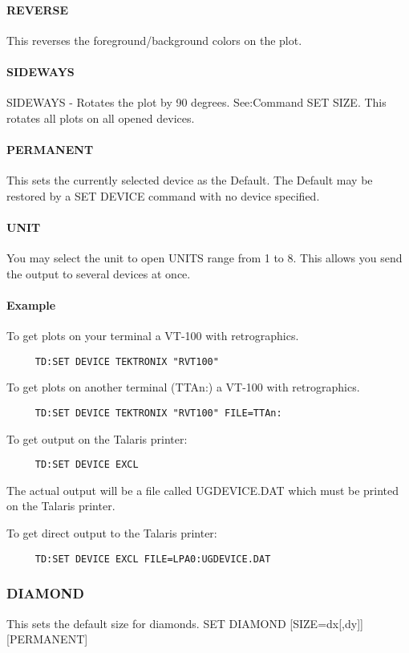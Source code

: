 \paragraph{REVERSE}
This reverses the foreground/background colors on the plot.  
\paragraph{SIDEWAYS}
SIDEWAYS  -  Rotates  the  plot by 90 degrees.  See:Command SET SIZE.
This rotates all plots on all opened devices.  
\paragraph{PERMANENT}
This  sets the currently selected device as the Default.  The Default
may be restored by a SET DEVICE command with no device specified.  
\paragraph{UNIT}
You may select the unit to open UNITS range from 1 to 8.  This allows
you send the output to several devices at once.  
\paragraph{Example}
To get plots on your terminal a VT-100 with retrographics.  
\begin{verbatim}
     TD:SET DEVICE TEKTRONIX "RVT100" 
\end{verbatim}

To get plots on another terminal (TTAn:) a VT-100 with retrographics. 
\begin{verbatim}
     TD:SET DEVICE TEKTRONIX "RVT100" FILE=TTAn:  
\end{verbatim}

To get output on the Talaris printer:  
\begin{verbatim}
     TD:SET DEVICE EXCL 
\end{verbatim}
The  actual  output  will be a file called UGDEVICE.DAT which must be
printed on the Talaris printer.  

To get direct output to the Talaris printer:  
\begin{verbatim}
     TD:SET DEVICE EXCL FILE=LPA0:UGDEVICE.DAT 
\end{verbatim}
\subsubsection{DIAMOND}
This sets the default size for diamonds.  
SET DIAMOND [SIZE=dx[,dy]] [PERMANENT] 

